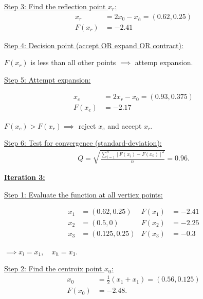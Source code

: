 \documentclass{article}
\begin{document}
\qquad
\underline{Step 3: Find the reflection point $x_r$:}
\begin{align*}
  x_r    &= 2x_0 - x_h = (0.62, 0.25) \\
  F(x_r) &= -2.41
\end{align*}
\newline

\qquad
\underline{Step 4: Decision point (accept OR expand OR contract):}
\newline

\qquad
$F(x_r)$ is less than all other points $\implies$ attemp expansion.
\newline

\qquad
\underline{Step 5: Attempt expansion:}

\begin{align*}
  x_e    &= 2x_r - x_0 = (0.93, 0.375) \\
  F(x_e) &= -2.17
\end{align*}

\qquad
$F(x_c) > F(x_r) \implies$ reject $x_e$ and accept $x_r$.
\newline

\qquad
\underline{Step 6: Test for convergence (standard-deviation):}
\begin{align*}
  Q = \sqrt{\frac{\sum_{i=1}^{n}  [ F(x_i) - F(x_0) ]^2 }{n}} = 0.96.
\end{align*}
\newline
\newline

\textbf{\underline{Iteration 3:}}
\newline

\qquad
\underline{Step 1: Evaluate the function at all vertiex points:}

\begin{align*}
  x_1 &= (0.62,0.25)   &F(x_1) &= -2.41 \\
  x_2 &= (0.5,0) &F(x_2) &= -2.25 \\
  x_3 &= (0.125,0.25) &F(x_3) &= -0.3
\end{align*}

\qquad
$\implies x_l = x_1, \quad x_h = x_3.$
\newline

\qquad
\underline{Step 2: Find the centroix point $x_0$:}
\begin{align*}
  x_0    &= \frac{1}{2} (x_1 + x_1) = (0.56, 0.125) \\
  F(x_0) &= -2.48.
\end{align*}
\newline
\end{document}
